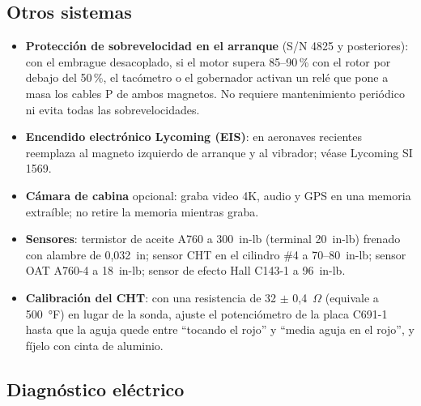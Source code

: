 \subsection{Otros sistemas}

\begin{itemize}
\item \textbf{Protección de sobrevelocidad en el arranque} (S/N 4825 y posteriores): con el embrague desacoplado, si el motor supera 85--90\,\% con el rotor por debajo del 50\,\%, el tacómetro o el gobernador activan un relé que pone a masa los cables P de ambos magnetos. No requiere mantenimiento periódico ni evita todas las sobrevelocidades.
\item \textbf{Encendido electrónico Lycoming (EIS)}: en aeronaves recientes reemplaza al magneto izquierdo de arranque y al vibrador; véase Lycoming SI 1569.
\item \textbf{Cámara de cabina} opcional: graba video 4K, audio y GPS en una memoria extraíble; no retire la memoria mientras graba.
\item \textbf{Sensores}: termistor de aceite A760 a 300~in-lb (terminal 20~in-lb) frenado con alambre de 0,032~in; sensor CHT en el cilindro \#4 a 70--80~in-lb; sensor OAT A760-4 a 18~in-lb; sensor de efecto Hall C143-1 a 96~in-lb.
\item \textbf{Calibración del CHT}: con una resistencia de 32 $\pm$ 0,4~$\Omega$ (equivale a 500~°F) en lugar de la sonda, ajuste el potenciómetro de la placa C691-1 hasta que la aguja quede entre ``tocando el rojo'' y ``media aguja en el rojo'', y fíjelo con cinta de aluminio.
\end{itemize}

\subsection{Diagnóstico eléctrico}

